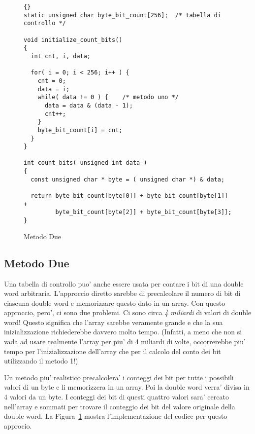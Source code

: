 \begin{figure}[t]
\begin{lstlisting}[frame=tlrb]{}
static unsigned char byte_bit_count[256];  /* tabella di controllo */

void initialize_count_bits()
{
  int cnt, i, data;

  for( i = 0; i < 256; i++ ) {
    cnt = 0;
    data = i;
    while( data != 0 ) {	/* metodo uno */
      data = data & (data - 1);
      cnt++;
    }
    byte_bit_count[i] = cnt;
  }
}

int count_bits( unsigned int data )
{
  const unsigned char * byte = ( unsigned char *) & data;

  return byte_bit_count[byte[0]] + byte_bit_count[byte[1]] +
         byte_bit_count[byte[2]] + byte_bit_count[byte[3]];
}
\end{lstlisting}
\caption{Metodo Due \label{fig:meth2}}
\end{figure}

\subsection{Metodo Due}

Una tabella di controllo puo' anche essere usata per contare i bit di
una double word arbitraria. L'approccio diretto sarebbe di precalcolare
il numero di bit di ciascuna double word e memorizzare questo dato 
in un array. Con questo approccio, pero', ci sono due problemi. Ci
sono circa \emph{4 miliardi} di valori di double word! Questo 
significa che l'array sarebbe veramente grande e che la sua inizializzazione
richiederebbe davvero molto tempo. (Infatti, a meno che non si vada ad
usare realmente l'array per piu' di 4 miliardi di volte, occorrerebbe
piu' tempo per l'inizializzazione dell'array che per il calcolo del
conto dei bit utilizzando il metodo 1!)

Un metodo piu' realistico  precalcolera' i conteggi dei bit per tutte i
possibili valori di un byte e li memorizzera in un array. Poi la
double word verra' divisa in 4 valori da un byte. I conteggi dei bit
di questi quattro valori sara' cercato nell'array e sommati per 
trovare il conteggio dei bit del valore originale della double word.
La Figura~\ref{fig:meth2} mostra l'implementazione del codice per
questo approcio.

